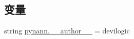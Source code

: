 \subsection*{变量}
\begin{DoxyCompactItemize}
\item 
string \hyperlink{namespacepynann_a148d8b017c5d350dd90e06f0b3b64a9e}{pynann.\+\_\+\+\_\+author\+\_\+\+\_\+} = \textquotesingle{}devilogic\textquotesingle{}
\end{DoxyCompactItemize}
